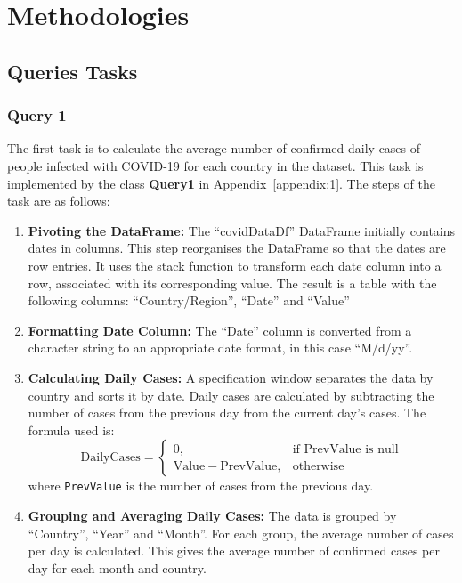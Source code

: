 \documentclass[12pt,oneside]{book} %
\begin{document}
\chapter{Methodologies}\label{chap:one}

\section{Queries Tasks}
\subsection{Query 1}

The first task is to calculate the average number of confirmed daily cases of
people infected with COVID-19 for each country in the dataset. This task is
implemented by the class \textbf{Query1} in Appendix~\ref{appendix:1}. The
steps of the task are as follows:
\begin{enumerate}
    \item \textbf{Pivoting the DataFrame:} The ``covidDataDf'' DataFrame initially contains dates in columns. This step reorganises the DataFrame so that the dates are row entries. It uses the stack function to transform each date column into a row, associated with its corresponding value. The result is a table with the following columns: ``Country/Region'', ``Date'' and ``Value''

    \item \textbf{Formatting Date Column:} The ``Date'' column is converted from a character string to an appropriate date format, in this case ``M/d/yy''.

    \item \textbf{Calculating Daily Cases:} A specification window separates the data by country and sorts it by date. Daily cases are calculated by subtracting the number of cases from the previous day from the current day's cases. The formula used is:
          \begin{equation}
              \text{DailyCases} =
              \begin{cases}
                  \text{0},                        & \text{if } \text{PrevValue is null} \\
                  \text{Value} - \text{PrevValue}, & \text{otherwise}
              \end{cases}
          \end{equation}
          where \texttt{PrevValue} is the number of cases from the previous day.

    \item \textbf{Grouping and Averaging Daily Cases:} The data is grouped by ``Country'', ``Year'' and ``Month''. For each group, the average number of cases per day is calculated. This gives the average number of confirmed cases per day for each month and country.
\end{enumerate}
\end{document}
